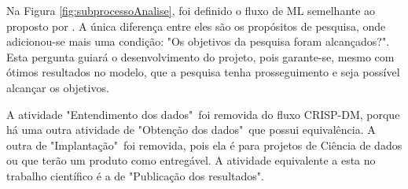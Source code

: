 Na Figura \ref{fig:subprocessoAnalise}, foi definido o fluxo de ML semelhante ao proposto por . A única diferença entre eles são os propósitos de pesquisa, onde adicionou-se mais uma condição: "Os objetivos da pesquisa foram alcançados?". Esta pergunta guiará o desenvolvimento do projeto, pois garante-se, mesmo com ótimos resultados no modelo, que a pesquisa tenha prosseguimento e seja possível alcançar os objetivos.

A atividade "Entendimento dos dados"\ foi removida do fluxo CRISP-DM, porque há uma outra atividade de "Obtenção dos dados"\ que possui equivalência. A outra de "Implantação"\ foi removida, pois ela é para projetos de Ciência de dados ou que terão um produto como entregável. A atividade equivalente a esta no trabalho científico é a de "Publicação dos resultados".